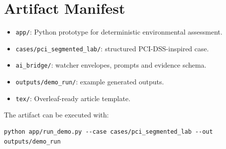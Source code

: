\section{Artifact Manifest}

\begin{itemize}[noitemsep]
  \item \texttt{app/}: Python prototype for deterministic environmental assessment.
  \item \texttt{cases/pci\_segmented\_lab/}: structured PCI-DSS-inspired case.
  \item \texttt{ai\_bridge/}: watcher envelopes, prompts and evidence schema.
  \item \texttt{outputs/demo\_run/}: example generated outputs.
  \item \texttt{tex/}: Overleaf-ready article template.
\end{itemize}

The artifact can be executed with:

\begin{verbatim}
python app/run_demo.py --case cases/pci_segmented_lab --out outputs/demo_run
\end{verbatim}
